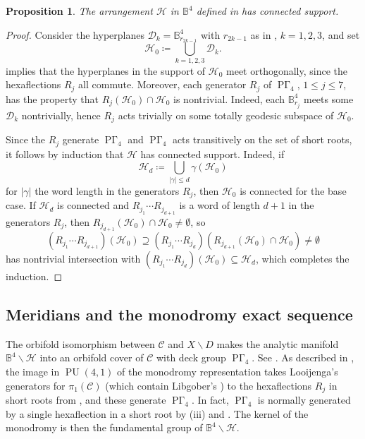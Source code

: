 \documentclass[11pt]{amsart}
\theoremstyle{plain}
\newtheorem{prop}[thm]{Proposition}
\theoremstyle{definition}
\theoremstyle{remark}
\newcommand{\bbB}{\mathbb{B}}
\newcommand{\calC}{\mathcal{C}}
\newcommand{\calD}{\mathcal{D}}
\newcommand{\calH}{\mathcal{H}}
\newcommand{\gam}{\gamma}
\DeclareMathOperator{\PU}{PU}
\newcommand{\ssm}{\smallsetminus}
\DeclareMathOperator{\PGam}{\mathrm{P}\Gamma}
\newenvironment{pf}{\begin{proof}}{\end{proof}}
\begin{document}
\begin{prop}\label{prop:ConnectedSupport}
The arrangement $\calH$ in $\bbB^4$ defined in  has connected support.
\end{prop}
\begin{pf}
Consider the hyperplanes $\calD_k = \bbB^4_{r_{2 k - 1}}$ with $r_{2 k - 1}$ as in , $k = 1,2,3$, and set
	\[
	\calH_0 \coloneqq \bigcup_{k = 1,2,3} \calD_k.
	\]
 implies that the hyperplanes in the support of $\calH_0$ meet orthogonally, since the hexaflections $R_j$ all commute. Moreover, each generator $R_j$ of $\PGam_4$, $1 \le j \le 7$, has the property that $R_j(\calH_0) \cap \calH_0$ is nontrivial. Indeed, each $\bbB^4_{r_j}$ meets some $\calD_k$ nontrivially, hence $R_j$ acts trivially on some totally geodesic subspace of $\calH_0$.

Since the $R_j$ generate $\PGam_4$ and $\PGam_4$ acts transitively on the set of short roots, it follows by induction that $\calH$ has connected support. Indeed, if
	\[
	\calH_d \coloneqq \bigcup_{|\gam| \le d}\gam(\calH_0)
	\]
for $|\gam|$ the word length in the generators $R_j$, then $\calH_0$ is connected for the base case. If $\calH_d$ is connected and $R_{j_1} \cdots R_{j_{d+1}}$ is a word of length $d+1$ in the generators $R_j$, then $R_{j_{d+1}}(\calH_0) \cap \calH_0 \neq \emptyset$, so
	\[
	(R_{j_1} \cdots R_{j_{d+1}})(\calH_0) \supseteq (R_{j_1} \cdots R_{j_d})\!\left(R_{j_{d+1}}(\calH_0) \cap \calH_0\right)\! \neq \emptyset
	\]
has nontrivial intersection with $(R_{j_1} \cdots R_{j_d})(\calH_0) \subseteq \calH_d$, which completes the induction.
\end{pf}

\subsection{Meridians and the monodromy exact sequence}\label{ssec:Exact}

The orbifold isomorphism between $\calC$ and $X \ssm D$ makes the analytic manifold $\bbB^4 \ssm \calH$ into an orbifold cover of $\calC$ with deck group $\PGam_4$. See \cite[Thm.\ 2.20]{ACT}. As described in , the image in $\PU(4,1)$ of the monodromy representation takes Looijenga's generators for $\pi_1(\calC)$ \cite{zbMATH05254786} (which contain Libgober's \cite{zbMATH03574026}) to the hexaflections $R_j$ in short roots from , and these generate $\PGam_4$. In fact, $\PGam_4$ is normally generated by a single hexaflection in a short root by (iii) and \cite[Thm.\ 2.14]{ACT}. The kernel of the monodromy is then the fundamental group of $\bbB^4 \ssm \calH$.
\end{document}
